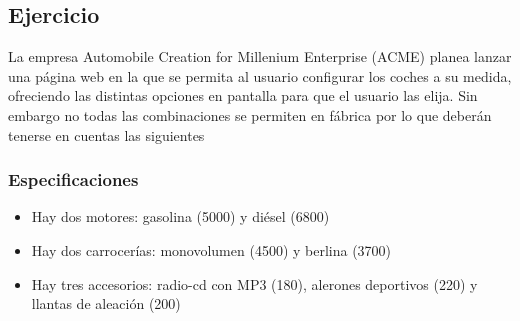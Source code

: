 \documentclass[letterpaper,10pt,spanish]{sphinxmanual}
\begin{document}
\begin{sphinxVerbatim}[commandchars=\\\{\}]
  
         
         
          
                 
          
                 
         
                 
         
\end{sphinxVerbatim}


\subsection{Ejercicio}
\label{\detokenize{tema4:id12}}
La empresa Automobile Creation for Millenium Enterprise (ACME) planea lanzar una página web en la que se permita al usuario configurar los coches a su medida, ofreciendo las distintas opciones en pantalla para que el usuario las elija. Sin embargo no todas las combinaciones se permiten en fábrica por lo que deberán tenerse en cuentas las siguientes


\subsubsection{Especificaciones}
\label{\detokenize{tema4:especificaciones}}\begin{itemize}
\item {} 
Hay dos motores: gasolina (5000) y diésel (6800)

\item {} 
Hay dos carrocerías: monovolumen (4500) y berlina (3700)

\item {} 
Hay tres accesorios: radio-cd con MP3 (180), alerones deportivos (220) y llantas de aleación (200)

\end{itemize}
\end{document}
